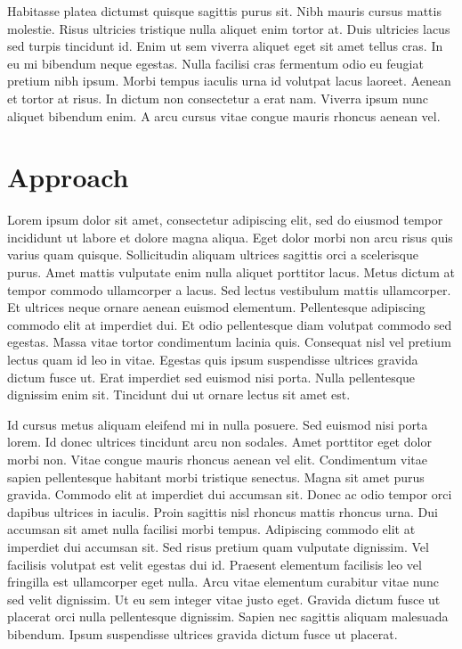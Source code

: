 \documentclass[conference]{IEEEtran}
\begin{document}
Habitasse platea dictumst quisque sagittis purus sit. Nibh mauris cursus mattis molestie. Risus ultricies tristique nulla aliquet enim tortor at. Duis ultricies lacus sed turpis tincidunt id. Enim ut sem viverra aliquet eget sit amet tellus cras. In eu mi bibendum neque egestas. Nulla facilisi cras fermentum odio eu feugiat pretium nibh ipsum. Morbi tempus iaculis urna id volutpat lacus laoreet. Aenean et tortor at risus. In dictum non consectetur a erat nam. Viverra ipsum nunc aliquet bibendum enim. A arcu cursus vitae congue mauris rhoncus aenean vel.

\section{Approach}
Lorem ipsum dolor sit amet, consectetur adipiscing elit, sed do eiusmod tempor incididunt ut labore et dolore magna aliqua. Eget dolor morbi non arcu risus quis varius quam quisque. Sollicitudin aliquam ultrices sagittis orci a scelerisque purus. Amet mattis vulputate enim nulla aliquet porttitor lacus. Metus dictum at tempor commodo ullamcorper a lacus. Sed lectus vestibulum mattis ullamcorper. Et ultrices neque ornare aenean euismod elementum. Pellentesque adipiscing commodo elit at imperdiet dui. Et odio pellentesque diam volutpat commodo sed egestas. Massa vitae tortor condimentum lacinia quis. Consequat nisl vel pretium lectus quam id leo in vitae. Egestas quis ipsum suspendisse ultrices gravida dictum fusce ut. Erat imperdiet sed euismod nisi porta. Nulla pellentesque dignissim enim sit. Tincidunt dui ut ornare lectus sit amet est.

Id cursus metus aliquam eleifend mi in nulla posuere. Sed euismod nisi porta lorem. Id donec ultrices tincidunt arcu non sodales. Amet porttitor eget dolor morbi non. Vitae congue mauris rhoncus aenean vel elit. Condimentum vitae sapien pellentesque habitant morbi tristique senectus. Magna sit amet purus gravida. Commodo elit at imperdiet dui accumsan sit. Donec ac odio tempor orci dapibus ultrices in iaculis. Proin sagittis nisl rhoncus mattis rhoncus urna. Dui accumsan sit amet nulla facilisi morbi tempus. Adipiscing commodo elit at imperdiet dui accumsan sit. Sed risus pretium quam vulputate dignissim. Vel facilisis volutpat est velit egestas dui id. Praesent elementum facilisis leo vel fringilla est ullamcorper eget nulla. Arcu vitae elementum curabitur vitae nunc sed velit dignissim. Ut eu sem integer vitae justo eget. Gravida dictum fusce ut placerat orci nulla pellentesque dignissim. Sapien nec sagittis aliquam malesuada bibendum. Ipsum suspendisse ultrices gravida dictum fusce ut placerat.
\end{document}
